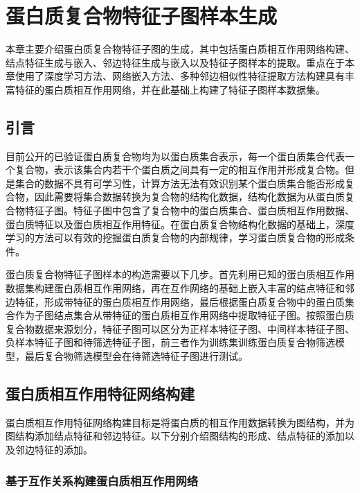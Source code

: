 \chapter{蛋白质复合物特征子图样本生成}
\label{chapter:featSubNetworkConstruct}

本章主要介绍蛋白质复合物特征子图的生成，其中包括蛋白质相互作用网络构建、结点特征生成与嵌入、邻边特征生成与嵌入以及特征子图样本的提取。重点在于本章使用了深度学习方法、网络嵌入方法、多种邻边相似性特征提取方法构建具有丰富特征的蛋白质相互作用网络，并在此基础上构建了特征子图样本数据集。

\section{引言}
\label{section:featSubNetworkConstruct:intro}

目前公开的已验证蛋白质复合物均为以蛋白质集合表示，每一个蛋白质集合代表一个复合物，表示该集合内若干个蛋白质之间具有一定的相互作用并形成复合物。但是集合的数据不具有可学习性，计算方法无法有效识别某个蛋白质集合能否形成复合物，因此需要将集合数据转换为复合物的结构化数据，结构化数据为从蛋白质复合物特征子图。特征子图中包含了复合物中的蛋白质集合、蛋白质相互作用数据、蛋白质特征以及蛋白质相互作用特征。在蛋白质复合物结构化数据的基础上，深度学习的方法可以有效的挖掘蛋白质复合物的内部规律，学习蛋白质复合物的形成条件。

蛋白质复合物特征子图样本的构造需要以下几步。首先利用已知的蛋白质相互作用数据集构建蛋白质相互作用网络，再在互作网络的基础上嵌入丰富的结点特征和邻边特征，形成带特征的蛋白质相互作用网络，最后根据蛋白质复合物中的蛋白质集合作为子图结点集合从带特征的蛋白质相互作用网络中提取特征子图。按照蛋白质复合物数据来源划分，特征子图可以区分为正样本特征子图、中间样本特征子图、负样本特征子图和待筛选特征子图，前三者作为训练集训练蛋白质复合物筛选模型，最后复合物筛选模型会在待筛选特征子图进行测试。

\section{蛋白质相互作用特征网络构建}
\label{section:featSubNetworkConstruct:featPPINetwork}

蛋白质相互作用特征网络构建目标是将蛋白质的相互作用数据转换为图结构，并为图结构添加结点特征和邻边特征。以下分别介绍图结构的形成、结点特征的添加以及邻边特征的添加。

\subsection{基于互作关系构建蛋白质相互作用网络}
\label{subsection:featPPINetwork:networkConstruct}


